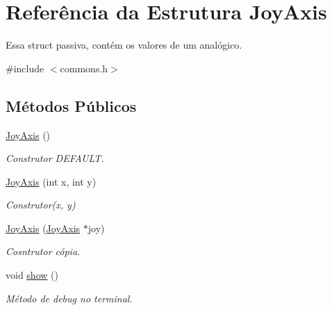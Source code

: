 \hypertarget{structJoyAxis}{}\section{Referência da Estrutura Joy\+Axis}
\label{structJoyAxis}


Essa struct passiva, contém os valores de um analógico.  




{\ttfamily \#include $<$commons.\+h$>$}

\subsection*{Métodos Públicos}
\begin{DoxyCompactItemize}
\item 
\hyperlink{structJoyAxis_a4110fd9e40c497d10b146a9e28ab2350}{Joy\+Axis} ()\hypertarget{structJoyAxis_a4110fd9e40c497d10b146a9e28ab2350}{}\label{structJoyAxis_a4110fd9e40c497d10b146a9e28ab2350}

\begin{DoxyCompactList}\small\item\em Construtor D\+E\+F\+A\+U\+LT. \end{DoxyCompactList}\item 
\hyperlink{structJoyAxis_a69bc9af6fe3584df372cba9bd302d2e4}{Joy\+Axis} (int x, int y)\hypertarget{structJoyAxis_a69bc9af6fe3584df372cba9bd302d2e4}{}\label{structJoyAxis_a69bc9af6fe3584df372cba9bd302d2e4}

\begin{DoxyCompactList}\small\item\em Construtor(x, y) \end{DoxyCompactList}\item 
\hyperlink{structJoyAxis_a484e76affd0f69ef771b57e43b2c836e}{Joy\+Axis} (\hyperlink{structJoyAxis}{Joy\+Axis} $\ast$joy)\hypertarget{structJoyAxis_a484e76affd0f69ef771b57e43b2c836e}{}\label{structJoyAxis_a484e76affd0f69ef771b57e43b2c836e}

\begin{DoxyCompactList}\small\item\em Cosntrutor cópia. \end{DoxyCompactList}\item 
void \hyperlink{structJoyAxis_ac66e92ad722b490af6225e945ed448bc}{show} ()\hypertarget{structJoyAxis_ac66e92ad722b490af6225e945ed448bc}{}\label{structJoyAxis_ac66e92ad722b490af6225e945ed448bc}

\begin{DoxyCompactList}\small\item\em Método de debug no terminal. \end{DoxyCompactList}\end{DoxyCompactItemize}
